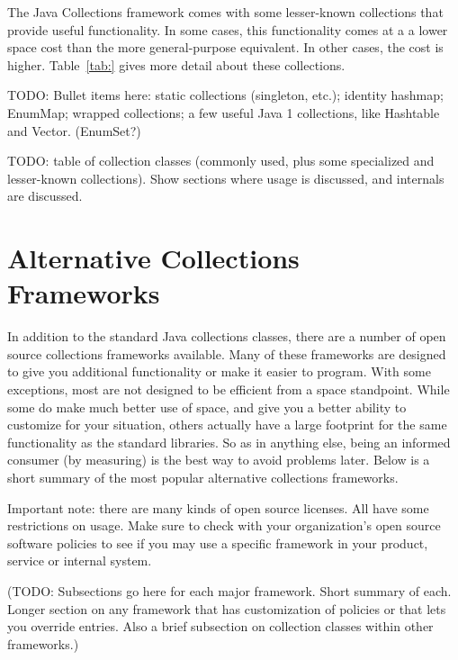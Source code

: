 The Java Collections framework comes with some lesser-known collections that
provide useful functionality.  In some cases, this functionality comes at a 
a lower space cost than the more general-purpose equivalent.  In other cases,
the cost is higher. Table~\ref{tab:} gives more detail about these collections.

TODO: Bullet items here: static collections (singleton, etc.); identity
hashmap; EnumMap; wrapped collections; a few useful Java 1 collections, like
Hashtable and Vector.  (EnumSet?)

TODO: table of collection classes (commonly used, plus some specialized and
lesser-known collections). Show sections where usage is discussed, and
internals are discussed.

\section{Alternative Collections Frameworks}
In addition to the standard Java collections classes, there are a number of
open source collections frameworks available. Many of these frameworks
are designed to give you additional functionality or make it easier to
program. With some exceptions, most are not designed to be efficient from a
space standpoint. While some do make much better use of space, and give you a
better ability to customize for your situation, others actually have a
large footprint for the same functionality as the standard libraries. So as in
anything else, being an informed consumer (by measuring) is the best way to
avoid problems later. Below is a short summary of the most
popular alternative collections frameworks.

Important note: there are many kinds of open source licenses. All have some
restrictions on usage. Make sure to check with your organization's open
source software policies to see if you may use a specific framework in 
your product, service or internal system.

(TODO: Subsections go here for each major framework. Short summary of each.
Longer section on any framework that has customization of policies or that lets you override
entries. Also a brief subsection on collection classes within other frameworks.)

